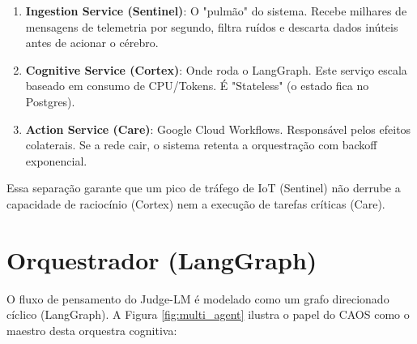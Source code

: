 \documentclass[12pt, a4paper]{article}
\begin{document}
\begin{enumerate}
    \item \textbf{Ingestion Service (Sentinel)}: O "pulmão" do sistema. Recebe milhares de mensagens de telemetria por segundo, filtra ruídos e descarta dados inúteis antes de acionar o cérebro.
    \item \textbf{Cognitive Service (Cortex)}: Onde roda o LangGraph. Este serviço escala baseado em consumo de CPU/Tokens. É "Stateless" (o estado fica no Postgres).
    \item \textbf{Action Service (Care)}: Google Cloud Workflows. Responsável pelos efeitos colaterais. Se a rede cair, o sistema retenta a orquestração com backoff exponencial.
\end{enumerate}

Essa separação garante que um pico de tráfego de IoT (Sentinel) não derrube a capacidade de raciocínio (Cortex) nem a execução de tarefas críticas (Care).

\section{Orquestrador (LangGraph)}
\label{sec:brain}

O fluxo de pensamento do Judge-LM é modelado como um grafo direcionado cíclico (LangGraph). A Figura \ref{fig:multi_agent} ilustra o papel do CAOS como o maestro desta orquestra cognitiva:
\end{document}
